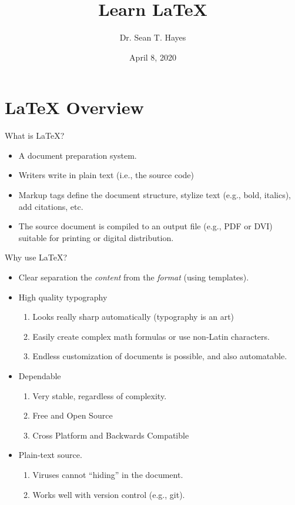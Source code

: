 \documentclass[english,aspectratio=169,14pt]{beamer}
\title{Learn \LaTeX}
\author{Dr. Sean T. Hayes }
\date{April 8, 2020}
\institute[CSU]{Charleston Southern University}
\begin{document}
\begin{frame}
    \maketitle
\end{frame}

\section{\LaTeX{} Overview}

\begin{frame}{What is \LaTeX{}?}
    \begin{itemize}
        \item A document preparation system.
        \item Writers write in plain text (i.e., the source code)
        \item Markup tags define the document structure, stylize text (e.g., bold, italics), add citations, etc.
        \item The source document is compiled to an output file (e.g., PDF or DVI) suitable for printing or digital distribution.
    \end{itemize}
\end{frame}

\begin{frame}{Why use \LaTeX{}?}
    \begin{itemize}
        \item<1-> Clear separation the \emph{content} from the \emph{format} (using templates).
        
        \item<2-> High quality typography
        \begin{enumerate}
            \item Looks really sharp automatically (typography is an art)
            \item Easily create complex math formulas or use non-Latin characters.
            \item Endless customization of documents is possible, and also automatable.
        \end{enumerate}
        
        \item<3-> Dependable
        \begin{enumerate}
            \item Very stable, regardless of complexity.
            \item Free and Open Source
            \item Cross Platform and Backwards Compatible
        \end{enumerate}
        
        \item<4-> Plain-text source.
        \begin{enumerate}
            \item Viruses cannot ``hiding'' in the document.
            \item Works well with version control (e.g., git).
        \end{enumerate}
    \end{itemize}
\end{frame}
\end{document}

